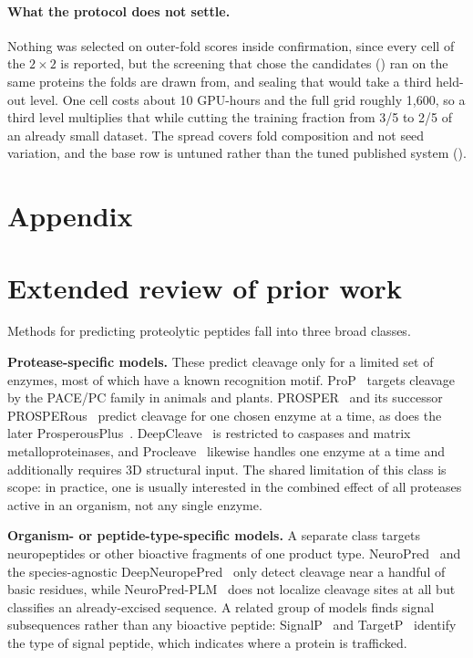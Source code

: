 \documentclass{article}
\begin{document}
\paragraph{What the protocol does not settle.} Nothing was selected on outer-fold scores inside
confirmation, since every cell of the $2\times2$ is reported, but the screening that chose the
candidates () ran on the same proteins the folds are drawn from, and sealing that would take a third
held-out level. One cell costs about 10 GPU-hours and the full grid roughly 1{,}600,
so a third level multiplies that while cutting the training fraction from 3/5 to 2/5 of an already
small dataset. The spread covers fold composition and not seed variation, and the base row is
untuned rather than the tuned published system ().




\newpage
\appendix
\section*{Appendix}

\section{Extended review of prior work}
\label{sec:app-related}


Methods for predicting proteolytic peptides fall into three broad classes.

\textbf{Protease-specific models.} These predict cleavage only for a limited set of enzymes, most of which have a known recognition motif. ProP~\citep{duckert2004prop} targets cleavage by the PACE/PC family in animals and plants. PROSPER~\citep{song2012prosper} and its successor PROSPERous~\citep{song2018prosperous} predict cleavage for one chosen enzyme at a time, as does the later ProsperousPlus~\citep{li2023prosperousplus}. DeepCleave~\citep{li2020deepcleave} is restricted to caspases and matrix metalloproteinases, and Procleave~\citep{li2020procleave} likewise handles one enzyme at a time and additionally requires 3D structural input. The shared limitation of this class is scope: in practice, one is usually interested in the combined effect of all proteases active in an organism, not any single enzyme.

\textbf{Organism- or peptide-type-specific models.} A separate class targets neuropeptides or other bioactive fragments of one product type. NeuroPred~\citep{southey2006neuropred} and the species-agnostic DeepNeuropePred~\citep{wang2024deepneuropepred} only detect cleavage near a handful of basic residues, while NeuroPred-PLM~\citep{wang2023neuropredplm} does not localize cleavage sites at all but classifies an already-excised sequence. A related group of models finds signal subsequences rather than any bioactive peptide: SignalP~\citep{teufel2022signalp6} and TargetP~\citep{almagro2019targetp} identify the type of signal peptide, which indicates where a protein is trafficked.
\end{document}

